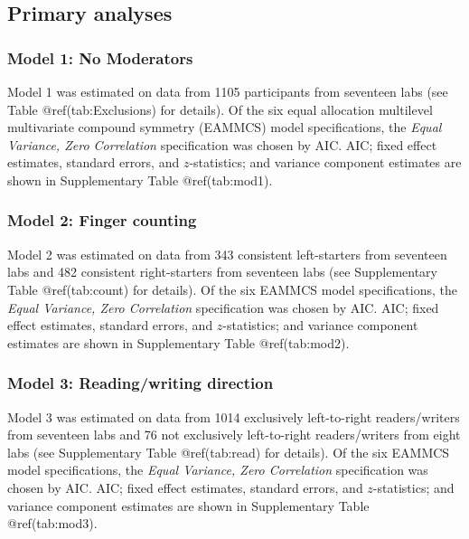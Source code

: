 \clearpage
\makeatletter
\efloat@restorefloats
\makeatother


\begin{appendix}
\section{}
\renewcommand{\thetable}{S\arabic{table}}
\renewcommand{\thefigure}{S\arabic{figure}}


\subsection{Primary analyses}\label{primary-analyses}

\subsubsection{Model 1: No Moderators}\label{model-1-no-moderators}

Model 1 was estimated on data from 1105 participants from seventeen labs
(see Table @ref(tab:Exclusions) for details). Of the six equal
allocation multilevel multivariate compound symmetry (EAMMCS) model
specifications, the \emph{Equal Variance, Zero Correlation}
specification was chosen by AIC. AIC; fixed effect estimates, standard
errors, and \(z\)-statistics; and variance component estimates are shown
in Supplementary Table @ref(tab:mod1).

\subsubsection{Model 2: Finger counting}\label{model-2-finger-counting}

Model 2 was estimated on data from 343 consistent left-starters from
seventeen labs and 482 consistent right-starters from seventeen labs
(see Supplementary Table @ref(tab:count) for details). Of the six EAMMCS
model specifications, the \emph{Equal Variance, Zero Correlation}
specification was chosen by AIC. AIC; fixed effect estimates, standard
errors, and \(z\)-statistics; and variance component estimates are shown
in Supplementary Table @ref(tab:mod2).

\subsubsection{Model 3: Reading/writing
direction}\label{model-3-readingwriting-direction}

Model 3 was estimated on data from 1014 exclusively left-to-right
readers/writers from seventeen labs and 76 not exclusively left-to-right
readers/writers from eight labs (see Supplementary Table @ref(tab:read)
for details). Of the six EAMMCS model specifications, the \emph{Equal
Variance, Zero Correlation} specification was chosen by AIC. AIC; fixed
effect estimates, standard errors, and \(z\)-statistics; and variance
component estimates are shown in Supplementary Table @ref(tab:mod3).


\end{appendix}
